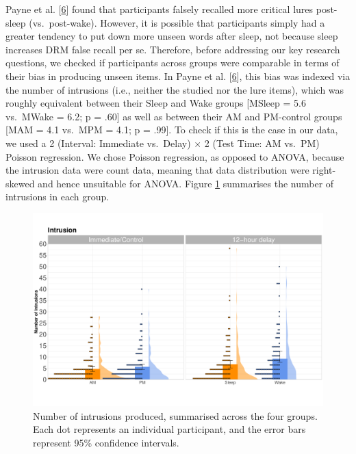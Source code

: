 \documentclass[
]{article}
\begin{document}
Payne et al. {[}\protect\hyperlink{ref-payne2009a}{6}{]} found that participants falsely recalled more critical lures post-sleep (vs.~post-wake). However, it is possible that participants simply had a greater tendency to put down more unseen words after sleep, not because sleep increases DRM false recall per se. Therefore, before addressing our key research questions, we checked if participants across groups were comparable in terms of their bias in producing unseen items. In Payne et al. {[}\protect\hyperlink{ref-payne2009a}{6}{]}, this bias was indexed via the number of intrusions (i.e., neither the studied nor the lure items), which was roughly equivalent between their Sleep and Wake groups {[}MSleep = 5.6 vs.~MWake = 6.2; p = .60{]} as well as between their AM and PM-control groups {[}MAM = 4.1 vs.~MPM = 4.1; p = .99{]}. To check if this is the case in our data, we used a 2 (Interval: Immediate vs.~Delay) \(\times\) 2 (Test Time: AM vs.~PM) Poisson regression. We chose Poisson regression, as opposed to ANOVA, because the intrusion data were count data, meaning that data distribution were right-skewed and hence unsuitable for ANOVA. Figure \ref{fig:intrusionfig} summarises the number of intrusions in each group.

\begin{figure}

{\centering \includegraphics{Figures/intrusiongraph} 

}

\caption{Number of intrusions produced, summarised across the four groups. Each dot represents an individual participant, and the error bars represent 95\% confidence intervals.}\label{fig:intrusionfig}
\end{figure}
\end{document}
